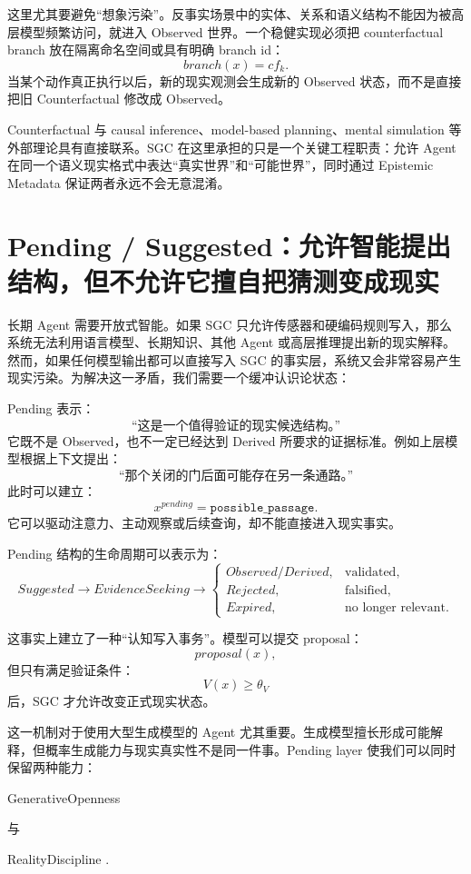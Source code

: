 这里尤其要避免“想象污染”。反事实场景中的实体、关系和语义结构不能因为被高层模型频繁访问，就进入 Observed 世界。一个稳健实现必须把 counterfactual branch 放在隔离命名空间或具有明确 branch id：
\[
branch(x)=cf_k.
\]
当某个动作真正执行以后，新的现实观测会生成新的 Observed 状态，而不是直接把旧 Counterfactual 修改成 Observed。

Counterfactual 与 causal inference、model-based planning、mental simulation 等外部理论具有直接联系。SGC 在这里承担的只是一个关键工程职责：允许 Agent 在同一个语义现实格式中表达“真实世界”和“可能世界”，同时通过 Epistemic Metadata 保证两者永远不会无意混淆。

\section{Pending / Suggested：允许智能提出结构，但不允许它擅自把猜测变成现实}

长期 Agent 需要开放式智能。如果 SGC 只允许传感器和硬编码规则写入，那么系统无法利用语言模型、长期知识、其他 Agent 或高层推理提出新的现实解释。然而，如果任何模型输出都可以直接写入 SGC 的事实层，系统又会非常容易产生现实污染。为解决这一矛盾，我们需要一个缓冲认识论状态：
\begin{statementbox}
\centering
{}
\end{statementbox}

Pending 表示：
\[
\text{“这是一个值得验证的现实候选结构。”}
\]
它既不是 Observed，也不一定已经达到 Derived 所要求的证据标准。例如上层模型根据上下文提出：
\[
\text{“那个关闭的门后面可能存在另一条通路。”}
\]
此时可以建立：
\[
x^{pending}
=
\texttt{possible\_passage}.
\]
它可以驱动注意力、主动观察或后续查询，却不能直接进入现实事实。

Pending 结构的生命周期可以表示为：
\[
Suggested
\rightarrow
EvidenceSeeking
\rightarrow
\begin{cases}
Observed/Derived, & \text{validated},\\
Rejected, & \text{falsified},\\
Expired, & \text{no longer relevant}.
\end{cases}
\]

这事实上建立了一种“认知写入事务”。模型可以提交 proposal：
\[
proposal(x),
\]
但只有满足验证条件：
\[
V(x)\geq\theta_V
\]
后，SGC 才允许改变正式现实状态。

这一机制对于使用大型生成模型的 Agent 尤其重要。生成模型擅长形成可能解释，但概率生成能力与现实真实性不是同一件事。Pending layer 使我们可以同时保留两种能力：
\begin{statementbox}
GenerativeOpenness
\end{statementbox}
与
\begin{statementbox}
RealityDiscipline .
\end{statementbox}

